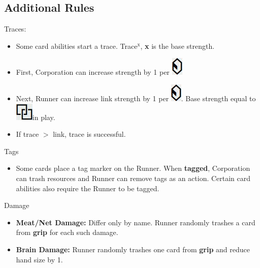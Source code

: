 \documentclass[12pt]{article}
\newenvironment{itemizeCustom}
{\begin{itemize}
  \setlength{\itemsep}{1pt}
  \setlength{\parskip}{0pt}
  \setlength{\parsep}{0pt}}
{\end{itemize}}
\newcommand{\credit}{\includegraphics[scale=0.40]{images/creditLarge.jpg}\hspace{0.3em}}
\newcommand{\link}{\includegraphics[scale=0.40]{images/linkLarge.jpg}\hspace{0.3em}}
\begin{document}
\begin{multicols*}{2}
\section*{Additional Rules}
Traces:
\begin{itemizeCustom}
	\item Some card abilities start a trace. Trace$^{\textrm{x}}$, \textbf{x} is the base strength.
	\item First, Corporation can increase strength by 1 per \credit
	\item Next, Runner can increase link strength by 1 per \credit. Base strength equal to \link in play.
	\item If trace $>$ link, trace is successful. 
\end{itemizeCustom}

Tags
\begin{itemizeCustom}
	\item Some cards place a tag marker on the Runner. When \textbf{tagged}, Corporation can trash resources and Runner can remove tags as an action. Certain card abilities also require the Runner to be tagged.
\end{itemizeCustom}

Damage
\begin{itemizeCustom}
	\item \textbf{Meat/Net Damage:} Differ only by name. Runner randomly trashes a card from \textbf{grip} for each such damage.
	\item \textbf{Brain Damage:} Runner randomly trashes one card from \textbf{grip} and reduce hand size by 1.
\end{itemizeCustom}

\end{multicols*}
\end{document}
